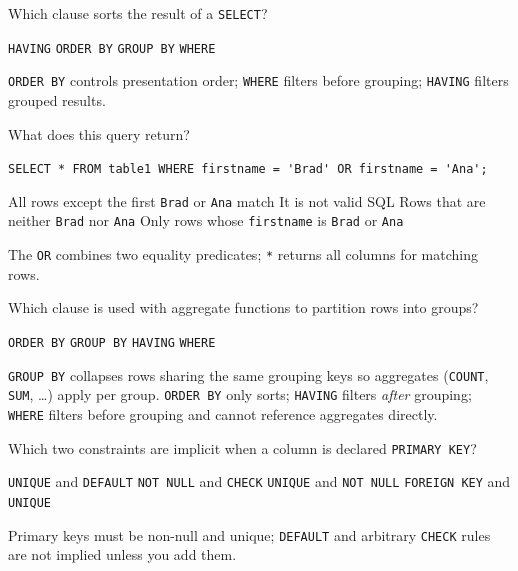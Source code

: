 \question[4]
Which clause sorts the result of a \texttt{SELECT}?
\begin{choices}
  \choice \lstinline[style=sqlinline]!HAVING!
  \CorrectChoice \lstinline[style=sqlinline]!ORDER BY!
  \choice \lstinline[style=sqlinline]!GROUP BY!
  \choice \lstinline[style=sqlinline]!WHERE!
\end{choices}
\begin{solution}
  \texttt{ORDER BY} controls presentation order; 
  \texttt{WHERE} filters before grouping; \texttt{HAVING} filters grouped results.
\end{solution}

\question[4]
What does this query return?
\par\noindent\lstinline[style=sqlinline]!SELECT * FROM table1 WHERE firstname = 'Brad' OR firstname = 'Ana';!
\begin{choices}
  \choice All rows except the first \texttt{Brad} or \texttt{Ana} match
  \choice It is not valid SQL
  \choice Rows that are neither \texttt{Brad} nor \texttt{Ana}
  \CorrectChoice Only rows whose \texttt{firstname} is \texttt{Brad} or \texttt{Ana}
\end{choices}
\begin{solution}
  The \texttt{OR} combines two equality predicates; \texttt{*} returns all columns for matching rows.
\end{solution}

\newpage


\question[4]
Which clause is used with aggregate functions to partition rows into groups?
\begin{choices}
  \choice \texttt{ORDER BY}
  \CorrectChoice \texttt{GROUP BY}
  \choice \texttt{HAVING}
  \choice \texttt{WHERE}
\end{choices}
\begin{solution}
  \texttt{GROUP BY} collapses rows sharing the same grouping keys so aggregates (\texttt{COUNT}, \texttt{SUM}, \ldots) apply per group. \texttt{ORDER BY} only sorts; \texttt{HAVING} filters \emph{after} grouping; \texttt{WHERE} filters before grouping and cannot reference aggregates directly.
\end{solution}

\question[4]
Which two constraints are implicit when a column is declared \texttt{PRIMARY KEY}?
\begin{choices}
  \choice \texttt{UNIQUE} and \texttt{DEFAULT}
  \choice \texttt{NOT NULL} and \texttt{CHECK}
  \CorrectChoice \texttt{UNIQUE} and \texttt{NOT NULL}
  \choice \texttt{FOREIGN KEY} and \texttt{UNIQUE}
\end{choices}
\begin{solution}
  Primary keys must be non-null and unique; \texttt{DEFAULT} and arbitrary \texttt{CHECK} rules are not implied unless you add them.
\end{solution}

